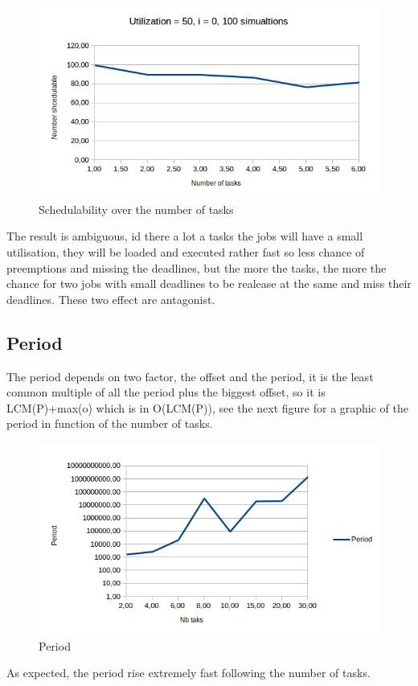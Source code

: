 \documentclass[a4paper,12pt]{article}
\begin{document}
\begin{figure}[H]
	\begin{center}
		\includegraphics{schedN.png}
	\end{center}
	\label{sched}
	\caption{Schedulability over the number of tasks}
\end{figure}

The result is ambiguous, id there a lot a tasks the jobs will have a small utilisation, they will be loaded and executed rather fast so less chance of preemptions and missing the deadlines, but the more the tasks, the more the chance for two jobs with small deadlines to be realease at the same and miss their deadlines. These two effect are antagonist.

\subsection{Period}
The period depends on two factor, the offset and the period, it is the least common multiple of all the period plus the biggest offset, so it is LCM(P)+max(o) which is in O(LCM(P)), see the next figure for a graphic of the period in function of the number of tasks.\\

\begin{figure}[H]
	\begin{center}
		\includegraphics{periodtasks.png}
	\end{center}
	\label{period}
	\caption{Period}
\end{figure}
As expected, the period rise extremely fast following the number of tasks.
\end{document}
